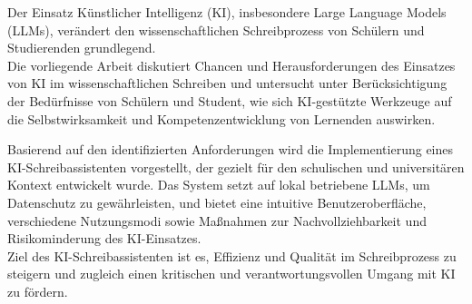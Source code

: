 \documentclass[../main.tex]{subfiles}
\begin{document}
Der Einsatz Künstlicher Intelligenz (KI), insbesondere Large Language Models (LLMs), verändert den wissenschaftlichen Schreibprozess von Schülern und Studierenden grundlegend. \\
Die vorliegende Arbeit diskutiert Chancen und Herausforderungen des Einsatzes von KI im wissenschaftlichen Schreiben und untersucht unter Berücksichtigung der Bedürfnisse von Schülern und Student, wie sich KI-gestützte Werkzeuge auf die Selbstwirksamkeit und Kompetenzentwicklung von Lernenden auswirken.

Basierend auf den identifizierten Anforderungen wird die Implementierung eines KI-Schreibassistenten vorgestellt, der gezielt für den schulischen und universitären Kontext entwickelt wurde. Das System setzt auf lokal betriebene LLMs, um Datenschutz zu gewährleisten, und bietet eine intuitive Benutzeroberfläche, verschiedene Nutzungsmodi  sowie Maßnahmen zur Nachvollziehbarkeit und Risikominderung des KI-Einsatzes. \\
Ziel des KI-Schreibassistenten ist es, Effizienz und Qualität im Schreibprozess zu steigern und zugleich einen kritischen und verantwortungsvollen Umgang mit KI zu fördern.
\end{document}
